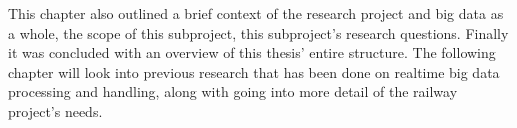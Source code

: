 This chapter also outlined a brief context of the research project and big data as a whole, the scope of this subproject,
this subproject's research questions. Finally it was concluded with an overview of this thesis' entire structure. The
following chapter will look into previous research that has been done on realtime big data processing and handling,
along with going into more detail of the railway project's needs.


